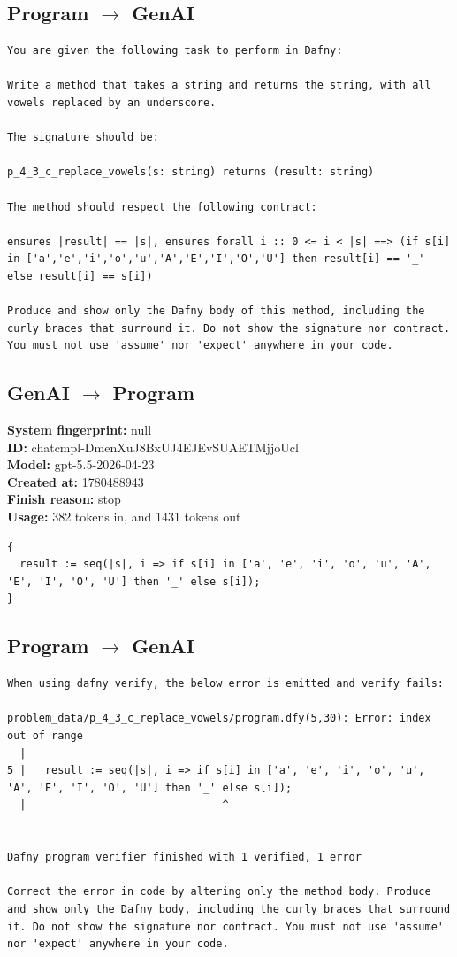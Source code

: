 \documentclass{article}
\begin{document}
\subsection*{Program $\rightarrow$ GenAI}
\begin{lstlisting}
You are given the following task to perform in Dafny:

Write a method that takes a string and returns the string, with all vowels replaced by an underscore.

The signature should be:

p_4_3_c_replace_vowels(s: string) returns (result: string)

The method should respect the following contract:

ensures |result| == |s|, ensures forall i :: 0 <= i < |s| ==> (if s[i] in ['a','e','i','o','u','A','E','I','O','U'] then result[i] == '_' else result[i] == s[i])

Produce and show only the Dafny body of this method, including the curly braces that surround it. Do not show the signature nor contract. You must not use 'assume' nor 'expect' anywhere in your code.
\end{lstlisting}
\subsection*{GenAI $\rightarrow$ Program}
\textbf{System fingerprint: }null
\\\textbf{ID: }chatcmpl-DmenXuJ8BxUJ4EJEvSUAETMjjoUcl
\\\textbf{Model: }gpt-5.5-2026-04-23
\\\textbf{Created at: }1780488943
\\\textbf{Finish reason: }stop
\\\textbf{Usage: }382 tokens in, and 1431 tokens out
\begin{lstlisting}
{
  result := seq(|s|, i => if s[i] in ['a', 'e', 'i', 'o', 'u', 'A', 'E', 'I', 'O', 'U'] then '_' else s[i]);
}
\end{lstlisting}
\subsection*{Program $\rightarrow$ GenAI}
\begin{lstlisting}
When using dafny verify, the below error is emitted and verify fails:

problem_data/p_4_3_c_replace_vowels/program.dfy(5,30): Error: index out of range
  |
5 |   result := seq(|s|, i => if s[i] in ['a', 'e', 'i', 'o', 'u', 'A', 'E', 'I', 'O', 'U'] then '_' else s[i]);
  |                               ^


Dafny program verifier finished with 1 verified, 1 error

Correct the error in code by altering only the method body. Produce and show only the Dafny body, including the curly braces that surround it. Do not show the signature nor contract. You must not use 'assume' nor 'expect' anywhere in your code.
\end{lstlisting}
\end{document}
